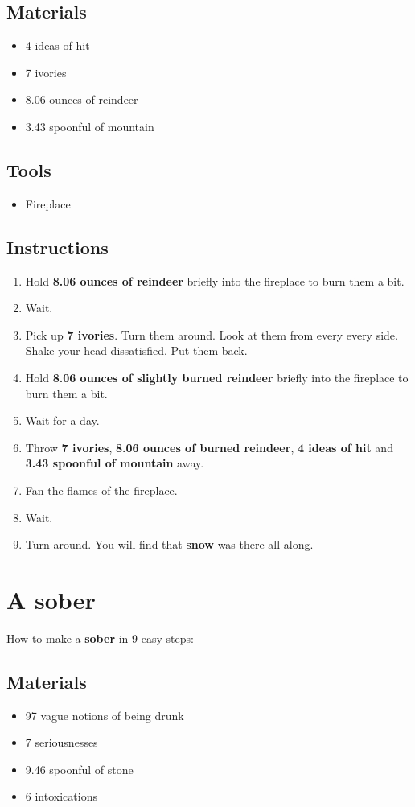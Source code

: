\documentclass{article}
\begin{document}
\subsection{Materials}\begin{itemize}
\item 
4 ideas of hit
\item 
7 ivories
\item 
8.06 ounces of reindeer
\item 
3.43 spoonful of mountain
\end{itemize}
\subsection{Tools}\begin{itemize}
\item 
Fireplace
\end{itemize}
\subsection{Instructions}\begin{enumerate}
\item 
Hold \textbf{8.06 ounces of reindeer} briefly into the fireplace to burn them a bit.
\item 
Wait.
\item 
Pick up \textbf{7 ivories}. Turn them around. Look at them from every every side. Shake your head dissatisfied. Put them back.
\item 
Hold \textbf{8.06 ounces of slightly burned reindeer} briefly into the fireplace to burn them a bit.
\item 
Wait for a day.
\item 
Throw \textbf{7 ivories}, \textbf{8.06 ounces of burned reindeer}, \textbf{4 ideas of hit} and \textbf{3.43 spoonful of mountain} away.
\item 
Fan the flames of the fireplace.
\item 
Wait.
\item 
Turn around. You will find that \textbf{snow} was there all along.
\end{enumerate}
\newpage
\section{A sober}How to make a \textbf{sober} in 9 easy steps:

\subsection{Materials}\begin{itemize}
\item 
97 vague notions of being drunk
\item 
7 seriousnesses
\item 
9.46 spoonful of stone
\item 
6 intoxications
\end{itemize}
\end{document}
